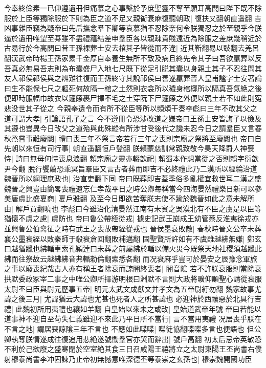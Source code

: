今奉終儉素一已仰遵遺冊但痛慕之心事繫於予庶聖靈不奪至願耳高閭曰陛下既不除服於上臣等獨除服於下則為臣之道不足又親䘖衰麻復聽朝政|{
	復扶又翻朝直遥翻}
吉凶事雜臣竊為疑帝曰先后撫念羣下卿等哀慕猶不忍除奈何令朕獨忍之於至親乎今朕逼於遺冊唯望至朞雖不盡禮藴結差申羣臣各以親疎貴賤遠近為除服之差庶幾稍近於古易行於今高閭曰昔王孫裸葬士安去棺其子皆從而不違|{
	近其靳翻易以䜴翻去羌呂翻漢武帝時楊王孫家累千金厚自奉養生無所不致及病且終先令其子曰吾欲臝葬以反吾真必無易吾志則為布囊盛尸入地七尺既下從足引脱其囊以身親土其子不忍往問其友人祁侯祁侯與之辨難往復而王孫終守其說祁侯曰善遂臝葬晉人皇甫謐字士安著論曰生不能保七尺之軀死何故隔一棺之土然則衣衾所以穢身棺槨所以隔真吾氣絶之後便即時服幅巾故衣以籧篨裹尸擇不毛之土穿阮下尸籧篨之外便以親土若不如此則寃悲没世其子從之}
今親奉遺令而有所不從臣等所以頻煩干奏李彪曰三年不改其父之道可謂大孝|{
	引論語孔子之言}
今不遵冊令恐涉改道之嫌帝曰王孫士安皆誨子以儉及其遵也豈異今日改父之道殆與此殊縱有所涉甘受後代之譏未忍今日之請羣臣又言春秋烝嘗事難廢闕|{
	禮曰喪三年不祭言帝若行三年之喪則宗廟之祭將至廢闕也}
帝曰自先朝以來恒有司行事|{
	朝直遥翻恒戶登翻}
朕賴蒙慈訓常親致敬今昊天降罸人神喪恃|{
	詩曰無母何恃喪息浪翻}
賴宗廟之靈亦輟歆祀|{
	賴蜀本作想當從之否則賴字衍歆尹今翻}
脫行饗薦恐乖冥旨羣臣又言古者葬而即吉不必終禮此乃二漢所以經綸治道魏晉所以綱理庶政也|{
	治直吏翻下同}
帝曰既葬即吉蓋季俗多亂權宜救世耳二漢之盛魏晉之興豈由簡畧喪禮遺忘仁孝哉平日之時公卿每稱當今四海晏然禮樂日新可以參美唐虞比盛夏商|{
	夏戶雅翻}
及至今日即欲苦奪朕志使不踰於魏晉如此之意未解所由|{
	解戶買翻曉也}
李彪曰今雖治化清晏然江南有未賓之吳漠北有不臣之虜是以臣等猶懷不虞之慮|{
	虞防也}
帝曰魯公帶絰從戎|{
	據史記武王崩成王幼管蔡反淮夷徐戎亦並興魯公伯禽征之時有武王之喪故帶絰從戎也}
晉侯墨衰敗敵|{
	春秋時晉文公卒未葬襄公墨衰絰以敗秦師于殽衰倉回翻敗補邁翻}
固聖賢所許如有不虞雖越紼無嫌|{
	鄭玄曰越猶躐也紼輴車索孔穎逹曰未葬之前屬紼於輴以備火災今既祭天地社稷須越躐此紼而往祭故云越紼紼音弗輴勑倫翻索悉各翻}
而况衰麻乎豈可於晏安之辰豫念軍旅之事以廢喪紀哉古人亦有稱王者除衰而諒闇終喪者|{
	闇音隂}
若不許朕衰服則當除衰拱默委政冢宰二事之中唯公卿所擇游明根曰淵默不言則大政將曠仰順聖心請從衰服太尉丕曰臣與尉元歷事五帝|{
	明元太武文成獻文并孝文為五帝尉紆勿翻}
魏家故事尤諱之後三月|{
	尤諱猶云大諱也尤甚也死者人之所甚諱也}
必迎神於西禳惡於北具行吉禮|{
	此魏初所用夷禮也禳如羊翻}
自皇始以來未之或改|{
	皇始道武帝年號}
帝曰若能以道事神不迎自至苟失仁義雖迎不來此乃平日所不當行|{
	言不當用夷禮}
况居喪乎朕在不言之地|{
	謂居喪諒隂三年不言也}
不應如此喋喋|{
	喋徒協翻喋喋多言也便語也}
但公卿執奪朕情遂成往復追用悲絶遂號慟羣官亦哭而辭出|{
	號戶高翻}
初太后忌帝英敏恐不利於己欲廢之盛寒閉於空室絶其食三日召咸陽王禧將立之太尉東陽王丕尚書右僕射穆泰尚書李冲固諫乃止帝初無憾意唯深德丕等泰崇之玄孫也|{
	穆崇魏開國功臣}
